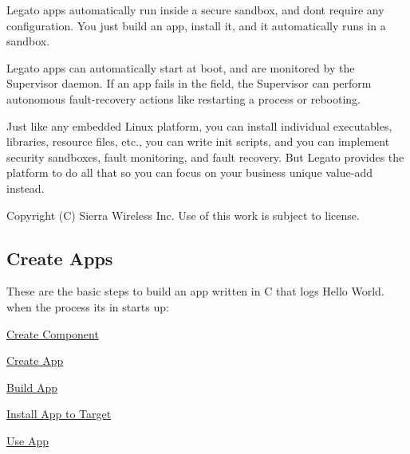 Legato apps automatically run inside a secure sandbox, and don\textquotesingle{}t require any configuration. You just build an app, install it, and it automatically runs in a sandbox.

Legato apps can automatically start at boot, and are monitored by the Supervisor daemon. If an app fails in the field, the Supervisor can perform autonomous fault-\/recovery actions like restarting a process or rebooting.

Just like any embedded Linux platform, you can install individual executables, libraries, resource files, etc., you can write init scripts, and you can implement security sandboxes, fault monitoring, and fault recovery. But Legato provides the platform to do all that so you can focus on your business\textquotesingle{} unique value-\/add instead.





Copyright (C) Sierra Wireless Inc. Use of this work is subject to license. \hypertarget{basicAppsCreate}{}\subsection{Create Apps}\label{basicAppsCreate}
These are the basic steps to build an app written in C that logs {\ttfamily Hello World.} when the process it\textquotesingle{}s in starts up\+:


\begin{DoxyItemize}
\item \hyperlink{basic_apps_create_basicAppsCreate_component}{Create Component}
\item \hyperlink{basic_apps_create_basicAppsCreate_adef}{Create App}
\item \hyperlink{basic_apps_create_basicAppsCreate_buildApp}{Build App}
\item \hyperlink{basic_apps_create_basicAppsCreate_instTarget}{Install App to Target}
\item \hyperlink{basic_apps_create_basicAppsCreate_usage}{Use App}
\end{DoxyItemize}


